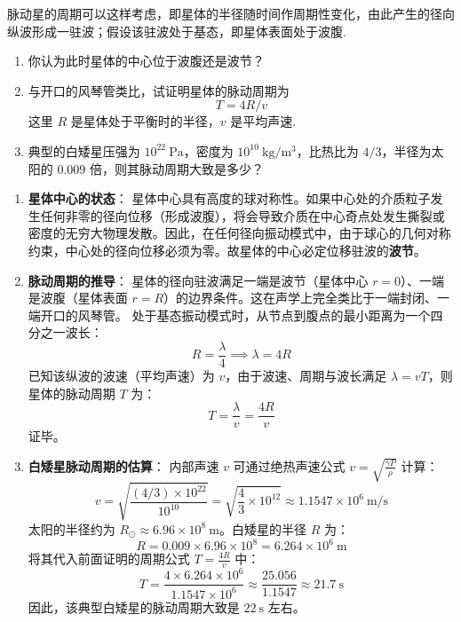 \begin{exercise}\label{ex:8.14}
脉动星的周期可以这样考虑，即星体的半径随时间作周期性变化，由此产生的径向纵波形成一驻波；假设该驻波处于基态，即星体表面处于波腹.
\begin{enumerate}
  \item[(a)] 你认为此时星体的中心位于波腹还是波节？
  \item[(b)] 与开口的风琴管类比，试证明星体的脉动周期为
  $$T = 4R/v$$
  这里 $R$ 是星体处于平衡时的半径，$v$ 是平均声速.
  \item[(c)] 典型的白矮星压强为 $10^{22} \ \mathrm{Pa}$，密度为 $10^{10} \ \mathrm{kg/m^3}$，比热比为 $4/3$，半径为太阳的 $0.009$ 倍，则其脉动周期大致是多少？
\end{enumerate}
\end{exercise}
\begin{solution}
\begin{enumerate}
    \item[(a)] \textbf{星体中心的状态}：
    星体中心具有高度的球对称性。如果中心处的介质粒子发生任何非零的径向位移（形成波腹），将会导致介质在中心奇点处发生撕裂或密度的无穷大物理发散。因此，在任何径向振动模式中，由于球心的几何对称约束，中心处的径向位移必须为零。故星体的中心必定位移驻波的\textbf{波节}。

    \item[(b)] \textbf{脉动周期的推导}：
    星体的径向驻波满足一端是波节（星体中心 $r = 0$）、一端是波腹（星体表面 $r = R$）的边界条件。这在声学上完全类比于一端封闭、一端开口的风琴管。
    处于基态振动模式时，从节点到腹点的最小距离为一个四分之一波长：
    $$ R = \frac{\lambda}{4} \implies \lambda = 4R $$
    已知该纵波的波速（平均声速）为 $v$，由于波速、周期与波长满足 $\lambda = v T$，则星体的脉动周期 $T$ 为：
    $$ T = \frac{\lambda}{v} = \frac{4R}{v} $$
    证毕。

    \item[(c)] \textbf{白矮星脉动周期的估算}：
    内部声速 $v$ 可通过绝热声速公式 $v = \sqrt{\frac{\gamma P}{\rho}}$ 计算：
    $$ v = \sqrt{ \frac{(4/3) \times 10^{22}}{10^{10}} } = \sqrt{ \frac{4}{3} \times 10^{12} } \approx 1.1547 \times 10^6 \ \mathrm{m/s} $$
    太阳的半径约为 $R_{\odot} \approx 6.96 \times 10^8 \ \mathrm{m}$。白矮星的半径 $R$ 为：
    $$ R = 0.009 \times 6.96 \times 10^8 = 6.264 \times 10^6 \ \mathrm{m} $$
    将其代入前面证明的周期公式 $T = \frac{4R}{v}$ 中：
    $$ T = \frac{4 \times 6.264 \times 10^6}{1.1547 \times 10^6} \approx \frac{25.056}{1.1547} \approx 21.7 \ \mathrm{s} $$
    因此，该典型白矮星的脉动周期大致是 $22 \ \mathrm{s}$ 左右。
\end{enumerate}
\end{solution}

